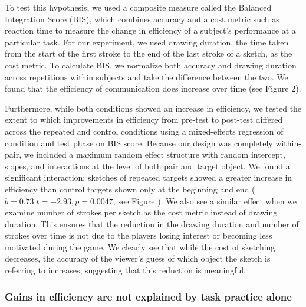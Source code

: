 \documentclass[10pt,letterpaper]{article}
\begin{document}
To test this hypothesis, we used a composite measure called the Balanced Integration Score (BIS), which combines accuracy and a cost metric such as reaction time to measure the change in efficiency of a subject's performance at a particular task. 
For our experiment, we used drawing duration, the time taken from the start of the first stroke to the end of the last stroke of a sketch, as the cost metric. 
To calculate BIS, we normalize both accuracy and drawing duration across repetitions within subjects and take the difference between the two. We found that the efficiency of communication does increase over time (see Figure 2).

Furthermore, while both conditions showed an increase in efficiency, we tested the extent to which improvements in efficiency from pre-test to post-test differed across the repeated and control conditions using a mixed-effects regression of condition and test phase on BIS score. 
Because our design was completely within-pair, we included a maximum random effect structure with random intercept, slopes, and interactions at the level of both pair and target object. 
We found a significant interaction: sketches of repeated targets showed a greater increase in efficiency than control targets shown only at the beginning and end ($b = 0.73. t = -2.93, p = 0.0047$; see Figure ). 
We also see a similar effect when we examine number of strokes per sketch as the cost metric instead of drawing duration. 
This ensures that the reduction in the drawing duration and number of strokes over time is not due to the players losing interest or becoming less motivated during the game. 
We clearly see that while the cost of sketching decreases, the accuracy of the viewer's guess of which object the sketch is referring to increases, suggesting that this reduction is meaningful.



\subsubsection{Gains in efficiency are not explained by task practice alone} 
\end{document}
